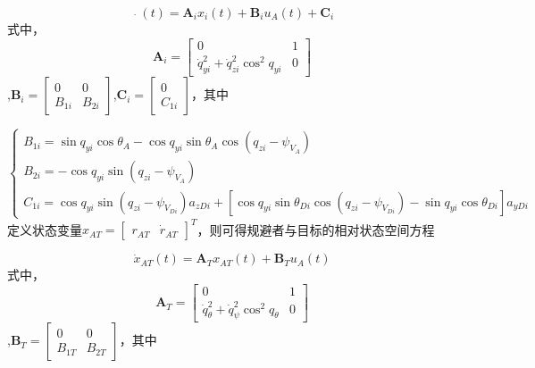\begin{equation}
\label{eq:12}
\mathop {{x_i}}\limits^. (t) = {{\mathbf{A}}_i}{x_i}(t) + {{\mathbf{B}}_i}{u_A}(t) + {{\mathbf{C}}_i}
\end{equation}
式中，\[{{\mathbf{A}}_i} = \left[ {\begin{array}{*{20}{c}}
  0&1 \\ 
  {\dot q_{yi}^2 + \dot q_{zi}^2{{\cos }^2}{q_{yi}}}&0 
\end{array}} \right]\],${{\mathbf{B}}_i} = \left[ {\begin{array}{*{20}{c}}
  0&0 \\ 
  {{B_{1i}}}&{{B_{2i}}} 
\end{array}} \right]$,${{\mathbf{C}}_i} = \left[ {\begin{array}{*{20}{c}}
  0 \\ 
  {{C_{1i}}} 
\end{array}} \right]$，其中

\begin{equation}
\label{eq:13}
\left\{ {\begin{array}{*{20}{l}}
  {{B_{1i}} = \sin {q_{yi}}\cos {\theta _A} - \cos {q_{yi}}\sin {\theta _A}\cos \left( {{q_{zi}} - {\psi _{{V_A}}}} \right)} \\ 
  {{B_{2i}} =  - \cos {q_{yi}}\sin \left( {{q_{zi}} - {\psi _{{V_A}}}} \right)} \\ 
  {{C_{1i}} = \cos {q_{yi}}\sin \left( {{q_{zi}} - {\psi _{{V_{Di}}}}} \right){a_{zDi}} + [\cos {q_{yi}}\sin {\theta _{Di}}\cos \left( {{q_{zi}} - {\psi _{{V_{Di}}}}} \right) - \sin {q_{yi}}\cos {\theta _{Di}}]{a_{yDi}}} 
\end{array}} \right.
\end{equation}
定义状态变量${x_{AT}} = {\left[ {\begin{array}{*{20}{c}}
  {{r_{AT}}}&{{{\dot r}_{AT}}} 
\end{array}} \right]^T}$，则可得规避者与目标的相对状态空间方程

\begin{equation}
\label{eq:14}
{\dot x_{AT}}(t) = {{\mathbf{A}}_T}{x_{AT}}(t) + {{\mathbf{B}}_T}{u_A}(t)
\end{equation}
式中，\[{{\mathbf{A}}_T} = \left[ {\begin{array}{*{20}{c}}
  0&1 \\ 
  {\dot q_\theta ^2 + \dot q_\psi ^2{{\cos }^2}{q_\theta }}&0 
\end{array}} \right]\],${{\mathbf{B}}_T} = \left[ {\begin{array}{*{20}{c}}
  0&0 \\ 
  {{B_{1T}}}&{{B_{2T}}} 
\end{array}} \right]$，其中

